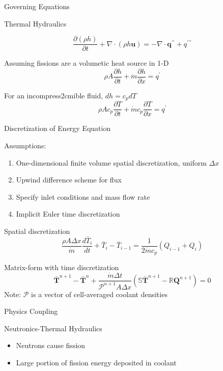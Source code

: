 \documentclass{beamer}
\begin{document}
\begin{section}{Governing Equations}
\begin{frame}{Thermal Hydraulics}
\begin{customlist}{2ex}{0pt}
  \[
   \frac{\partial\left(\rho h\right)}{\partial t}+\nabla\cdot\left(\rho h\mathbf{u}\right)=-\nabla\cdot\mathbf{q}^{\prime\prime}+q^{\prime\prime\prime}
  \]
  \vfill\item Assuming fissions are a volumetic heat source in 1-D
  \[
   \rho A\frac{\partial h}{\partial t}+\dot{m}\frac{\partial h}{\partial x}=q^{\prime}
  \]
  \vfill\item For an incompress2cmible fluid, $dh=c_{p}dT$
  \[
   \rho Ac_{p}\frac{\partial T}{\partial t}+\dot{m}c_{p}\frac{\partial T}{\partial x}=q^{\prime}
  \]
\end{customlist}
\end{frame}
\begin{frame}{Discretization of Energy Equation}
\begin{block}{Assumptions:}
\begin{enumerate}
  \item One-dimensional finite volume spatial discretization, uniform $\Delta x$
  \item Upwind difference scheme for flux
  \item Specify inlet conditions and mass flow rate
  \item Implicit Euler time discretization
\end{enumerate}
\end{block}
\begin{customlist}{2ex}{0pt}
  \item Spatial discretization
  \[
   \frac{\rho A\Delta x}{\dot{m}}\frac{d\bar{T}_{i}}{dt}+\bar{T}_{i}-\bar{T}_{i-1}=\frac{1}{2 \dot{m} c_{p}}\left(Q_{i-1}+Q_{i}\right)
  \]
  \item Matrix-form with time discretization
  \[
   \mathbf{\bar{T}}^{n+1}-\mathbf{\bar{T}}^{n}+\frac{\dot{m} \Delta t}{\mathcal{P}^{n+1}A\Delta x}\left(\mathbb{S}\mathbf{\bar{T}}^{n+1}-\mathbb{R}\mathbf{Q}^{n+1}\right)=0
  \]
  \alert{Note:} $\mathcal{P}$ is a vector of cell-averaged coolant densities
\end{customlist}
\end{frame}
\begin{frame}{Physics Coupling}
\begin{block}{Neutronics-Thermal Hydraulics}
  \begin{itemize}
    \item Neutrons cause fission
    \item Large portion of fission energy deposited in coolant

\end{itemize}
\end{block}
\end{frame}
\end{section}
\end{document}
